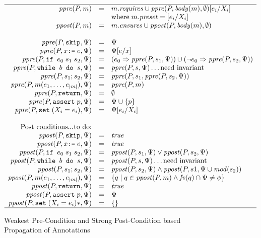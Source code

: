 \documentclass[10pt,notitlepage,twoside]{article}
\newcommand{\ppre}{\mathit{ppre}}
\newcommand{\ppost}{\mathit{ppost}}
\newcommand{\mod}{\mathit{mod}}
\newcommand{\fv}{\mathit{fv}}
\newcommand{\true}{\mathit{true}}
\begin{document}
\begin{figure}[tbp]
\begin{displaymath}
\begin{array}{rcl}
\hline 
\ppre(P,m) & = & m.\mathit{requires} \cup \ppre(P,\mathit{body}(m),\emptyset)[e_i/X_i]  \\
& & \mbox{where}\; m.\mathit{preset} = [e_i/X_i] \\
\ppost(P,m) & = & m.\mathit{ensures} \cup \ppost(P,\mathit{body}(m),\emptyset) \\
\ \\
\ppre(P,\texttt{skip},\Psi) & = & \Psi  \\
\ppre(P,x \texttt{:=}\; e,\Psi) & = & \Psi[e/x] \\
\ppre(P,\texttt{if }e_0\;s_1\;s_2,\Psi) & = & (e_0 \Rightarrow \ppre(P,s_1,\Psi)) \cup (\neg e_0 \Rightarrow \ppre(P,s_2,\Psi)) \\
\ppre(P,\texttt{while }b\texttt{ do }s,\Psi) & = & \ppre(P,s,\Psi)\ldots\mbox{need invariant} \\
\ppre(P,s_1; s_2,\Psi) & = & \ppre(P,s_1,\ppre(P,s_2,\Psi))  \\
\ppre(P,m(e_1,\ldots,e_{|m|}),\Psi) & = & \ppre(P,m)  \\
\ppre(P,\texttt{return},\Psi) & = & \emptyset  \\
\ppre(P,\texttt{assert}\;p,\Psi) & = & \Psi \cup \{ p \} \\
\ppre(P,\texttt{set}\;(X_i = e_i),\Psi) & = & \Psi[e_i/X_i] \\
\ \\
\mbox{Post conditions...to do:}\\
\ppost(P,\texttt{skip},\Psi) & = & \true  \\
\ppost(P,x \texttt{:=}\; e,\Psi) & = & \true \\
\ppost(P,\texttt{if }e_0\;s_1\;s_2,\Psi) & = & \ppost(P,s_1,\Psi) \vee \ppost(P,s_2,\Psi) \\
\ppost(P,\texttt{while }b\texttt{ do }s,\Psi) & = & \ppost(P,s,\Psi)\ldots\mbox{need invariant}  \\
\ppost(P,s_1; s_2,\Psi) & = & \ppost(P,s_2,\Psi) \wedge \ppost(P,s1,\Psi\cup\mod(s_2))  \\
\ppost(P,m(e_1,\ldots,e_{|m|}),\Psi) & = & \{ q \mid q \in \ppost(P,m) \wedge \fv(q) \cap \Psi \neq \phi   \}\\
\ppost(P,\texttt{return},\Psi) & = & \true \\
\ppost(P,\texttt{assert}\;p,\Psi) & = & \Psi \\
\ppost(P,\texttt{set}\;(X_i = e_i)*,\Psi) & = & \{ \}  \\
\hline
\end{array}
\end{displaymath}
\caption{Weakest Pre-Condition and Strong Post-Condition based Propagation of Annotations}\label{fig:wp-propagation}
\end{figure}
\end{document}
